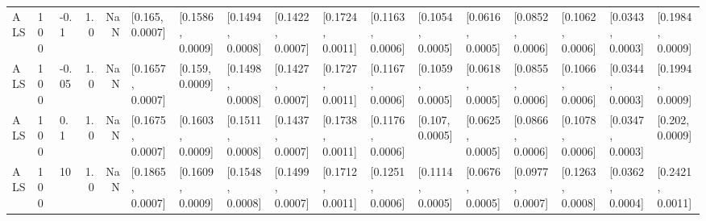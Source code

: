 \begin{tabular}{lllrrllllllllllll}
       ALS &  100 &  -0.1 &   1.0 &   NaN &   [0.165, 0.0007] &  [0.1586, 0.0009] &  [0.1494, 0.0008] &  [0.1422, 0.0007] &  [0.1724, 0.0011] &  [0.1163, 0.0006] &  [0.1054, 0.0005] &  [0.0616, 0.0005] &  [0.0852, 0.0006] &  [0.1062, 0.0006] &  [0.0343, 0.0003] &  [0.1984, 0.0009] \\
       ALS &  100 & -0.05 &   1.0 &   NaN &  [0.1657, 0.0007] &   [0.159, 0.0009] &  [0.1498, 0.0008] &  [0.1427, 0.0007] &  [0.1727, 0.0011] &  [0.1167, 0.0006] &  [0.1059, 0.0005] &  [0.0618, 0.0005] &  [0.0855, 0.0006] &  [0.1066, 0.0006] &  [0.0344, 0.0003] &  [0.1994, 0.0009] \\
       ALS &  100 &   0.1 &   1.0 &   NaN &  [0.1675, 0.0007] &  [0.1603, 0.0009] &  [0.1511, 0.0008] &  [0.1437, 0.0007] &  [0.1738, 0.0011] &  [0.1176, 0.0006] &   [0.107, 0.0005] &  [0.0625, 0.0005] &  [0.0866, 0.0006] &  [0.1078, 0.0006] &  [0.0347, 0.0003] &   [0.202, 0.0009] \\
       ALS &  100 &    10 &   1.0 &   NaN &  [0.1865, 0.0007] &  [0.1609, 0.0009] &  [0.1548, 0.0008] &  [0.1499, 0.0007] &  [0.1712, 0.0011] &  [0.1251, 0.0006] &  [0.1114, 0.0005] &  [0.0676, 0.0005] &  [0.0977, 0.0007] &  [0.1263, 0.0008] &  [0.0362, 0.0004] &  [0.2421, 0.0011] \\
\bottomrule
\end{tabular}
